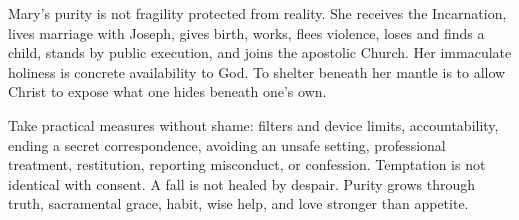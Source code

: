 Mary's purity is not fragility protected from reality. She receives the Incarnation, lives marriage with Joseph, gives birth, works, flees violence, loses and finds a child, stands by public execution, and joins the apostolic Church. Her immaculate holiness is concrete availability to God. To shelter beneath her mantle is to allow Christ to expose what one hides beneath one's own.

Take practical measures without shame: filters and device limits, accountability, ending a secret correspondence, avoiding an unsafe setting, professional treatment, restitution, reporting misconduct, or confession. Temptation is not identical with consent. A fall is not healed by despair. Purity grows through truth, sacramental grace, habit, wise help, and love stronger than appetite.




